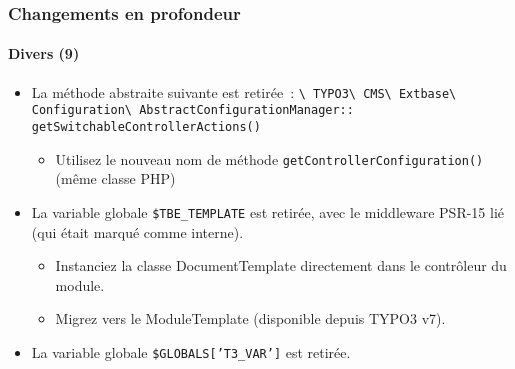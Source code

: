 \begin{frame}[fragile]
	\frametitle{Changements en profondeur}
	\framesubtitle{Divers (9)}

	\begin{itemize}

		\item La méthode abstraite suivante est retirée~:\newline
			\smaller
				\texttt{\textbackslash
					TYPO3\textbackslash
					CMS\textbackslash
					Extbase\textbackslash
					Configuration\textbackslash
					AbstractConfigurationManager::}\newline
					\texttt{getSwitchableControllerActions()}
			\normalsize

			\begin{itemize}\smaller
				\item[\ding{228}] Utilisez le nouveau nom de méthode \texttt{getControllerConfiguration()} (même classe PHP)
			\end{itemize}\normalsize

		\item La variable globale \texttt{\$TBE\_TEMPLATE} est retirée, avec le middleware PSR-15 lié (qui était marqué comme interne).

			\begin{itemize}\smaller
				\item[\ding{228}] Instanciez la classe DocumentTemplate directement dans le contrôleur du module.
				\item[\ding{228}] Migrez vers le ModuleTemplate (disponible depuis TYPO3 v7).
			\end{itemize}\normalsize

		\item La variable globale \texttt{\$GLOBALS['T3\_VAR']} est retirée.\newline

	\end{itemize}

\end{frame}


